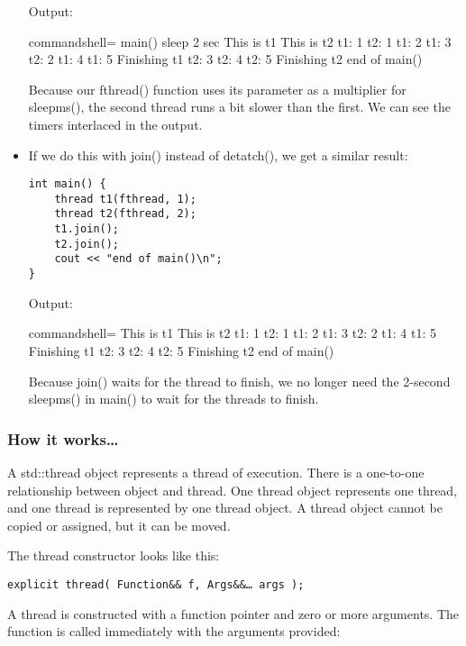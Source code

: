 \begin{itemize}
Output:

\begin{tcblisting}{commandshell={}}
main() sleep 2 sec
This is t1
This is t2
t1: 1
t2: 1
t1: 2
t1: 3
t2: 2
t1: 4
t1: 5
Finishing t1
t2: 3
t2: 4
t2: 5
Finishing t2
end of main()
\end{tcblisting}

Because our fthread() function uses its parameter as a multiplier for sleepms(), the second thread runs a bit slower than the first. We can see the timers interlaced in the output.

\item 
If we do this with join() instead of detatch(), we get a similar result:

\begin{lstlisting}[style=styleCXX]
int main() {
	thread t1(fthread, 1);
	thread t2(fthread, 2);
	t1.join();
	t2.join();
	cout << "end of main()\n";
}
\end{lstlisting}

Output:

\begin{tcblisting}{commandshell={}}
This is t1
This is t2
t1: 1
t2: 1
t1: 2
t1: 3
t2: 2
t1: 4
t1: 5
Finishing t1
t2: 3
t2: 4
t2: 5
Finishing t2
end of main()
\end{tcblisting}

Because join() waits for the thread to finish, we no longer need the 2-second sleepms() in main() to wait for the threads to finish.
\end{itemize}

\subsubsection{How it works…}

A std::thread object represents a thread of execution. There is a one-to-one relationship between object and thread. One thread object represents one thread, and one thread is represented by one thread object. A thread object cannot be copied or assigned, but it can be moved.

The thread constructor looks like this:

\begin{lstlisting}[style=styleCXX]
explicit thread( Function&& f, Args&&… args );
\end{lstlisting}

A thread is constructed with a function pointer and zero or more arguments. The function is called immediately with the arguments provided:

